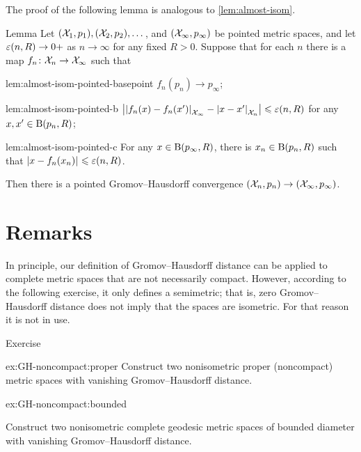 The proof of the following lemma is analogous to \ref{lem:almost-isom}.

\begin{thm}{Lemma}\label{lem:almost-isom-pointed}
Let $(\mathcal{X}_1, p_1),(\mathcal{X}_2,p_2),\dots$, and $(\mathcal{X}_\infty, p_\infty)$ be pointed metric spaces, and let $\varepsilon(n,R)\to0+$ as $n\to\infty$ for any fixed $R>0$.
Suppose that for each $n$ there is a map $f_n\colon\mathcal{X}_n\to\mathcal{X}_\infty$ such that


\begin{subthm}{lem:almost-isom-pointed-basepoint}
$f_n(p_n)\to p_\infty$;
\end{subthm}

\begin{subthm}{lem:almost-isom-pointed-b}
$\bigl|\dist{f_n(x)}{f_n(x')}{\spc{X}_\infty}-\dist{x}{x'}{\spc{X}_n}\bigr|\le \eps(n,R)$ for any $x,x'\z\in \oBall(p_n,R)$;
\end{subthm}

\begin{subthm}{lem:almost-isom-pointed-c}
For any $x \in \mathrm{B}{}(p_\infty,R)$, there is $x_n\in \mathrm{B}{}(p_n,R)$ such that $\dist{x}{f_n(x_n)}{}\le \eps(n,R)$.
\end{subthm}
Then there is a pointed Gromov--Hausdorff convergence $(\spc{X}_n,p_n)\z\to (\spc{X}_\infty,p_\infty)$.
\end{thm}

\section{Remarks}

In principle, our definition of Gromov--Hausdorff distance can be applied to complete metric spaces that are not necessarily compact.
However, according to the following exercise, it only defines a semimetric; that is, zero Gromov--Hausdorff distance does not imply that the spaces are isometric.
For that reason it is not in use.


\begin{thm}{Exercise}\label{ex:GH-noncompact}
\begin{subthm}{ex:GH-noncompact:proper}
Construct two nonisometric proper (noncompact) metric spaces with vanishing Gromov--Hausdorff distance.
\end{subthm}

\begin{subthm}{ex:GH-noncompact:bounded}

Construct two nonisometric complete geodesic metric spaces of bounded diameter with vanishing Gromov--Hausdorff distance.
\end{subthm}


\end{thm}
